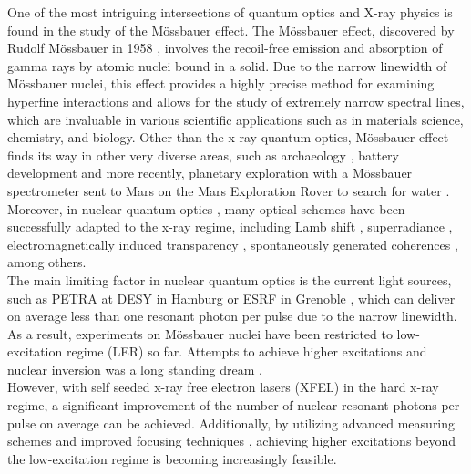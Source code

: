 One of the most intriguing intersections of quantum optics and X-ray physics is found in the study of the Mössbauer effect. The Mössbauer effect, discovered by Rudolf Mössbauer in 1958 \cite{Mssbauer1958}, involves the recoil-free emission and absorption of gamma rays by atomic nuclei bound in a solid. Due to the narrow linewidth of Mössbauer nuclei, this effect provides a highly precise method for examining hyperfine interactions and allows for the study of extremely narrow spectral lines, which are invaluable in various scientific applications such as in materials science, chemistry, and biology. Other than the x-ray quantum optics, Mössbauer effect finds its way in other very diverse areas, such as archaeology \cite{Wagner2004_archeology}, battery development \cite{Lippens2021_battery} and more recently, planetary exploration with a Mössbauer spectrometer sent to Mars on the Mars Exploration Rover to search for water \cite{Klingelhofer2004_mars}.\\

Moreover, in nuclear quantum optics \cite{Adams2013}, many optical schemes have been successfully adapted to the x-ray regime, including Lamb shift \cite{collectivelambshift}, superradiance \cite{superradiance}, electromagnetically induced transparency \cite{EITinxray}, spontaneously generated coherences \cite{spontaneouslygeneratedcoherences}, among others. \\

The main limiting factor in nuclear quantum optics is the current light sources, such as PETRA \MakeUppercase{} at DESY in Hamburg \cite{desy} or ESRF in Grenoble \cite{esrf}, which can deliver on average less than one resonant photon per pulse due to the narrow linewidth. As a result, experiments on Mössbauer nuclei have been restricted to low-excitation regime (LER) so far. Attempts to achieve higher excitations and nuclear inversion was a long standing dream \cite{oldproblem1,oldproblem2,oldproblem3}.   \\

However, with self seeded x-ray free electron lasers (XFEL) \cite{xrayFEL, XFEL2} in the hard x-ray regime, a significant improvement of the number of nuclear-resonant photons per pulse on average \cite{Shvydko2023,superradiance} can be achieved. Additionally, by utilizing advanced measuring schemes and improved focusing techniques \cite{dominik_higherexcitation}, achieving higher excitations beyond the low-excitation regime is becoming increasingly feasible.\\

